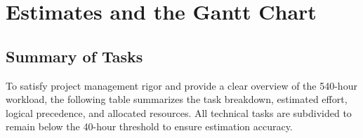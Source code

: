 \section{Estimates and the Gantt Chart}
\label{sec:estimates-and-the-gantt-chart}

\subsection{Summary of Tasks}
\label{subsec:summary-of-tasks}

To satisfy project management rigor and provide a clear overview of the 540-hour workload, the following table summarizes the task breakdown, estimated effort, logical precedence, and allocated resources. All technical tasks are subdivided to remain below the 40-hour threshold to ensure estimation accuracy.

